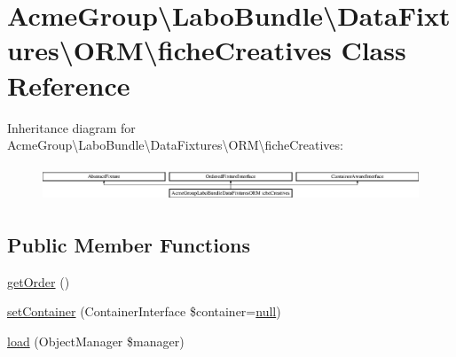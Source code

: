 \hypertarget{class_acme_group_1_1_labo_bundle_1_1_data_fixtures_1_1_o_r_m_1_1fiche_creatives}{\section{Acme\+Group\textbackslash{}Labo\+Bundle\textbackslash{}Data\+Fixtures\textbackslash{}O\+R\+M\textbackslash{}fiche\+Creatives Class Reference}
\label{class_acme_group_1_1_labo_bundle_1_1_data_fixtures_1_1_o_r_m_1_1fiche_creatives}
}
Inheritance diagram for Acme\+Group\textbackslash{}Labo\+Bundle\textbackslash{}Data\+Fixtures\textbackslash{}O\+R\+M\textbackslash{}fiche\+Creatives\+:\begin{figure}[H]
\begin{center}
\leavevmode
\includegraphics[height=1.060606cm]{class_acme_group_1_1_labo_bundle_1_1_data_fixtures_1_1_o_r_m_1_1fiche_creatives}
\end{center}
\end{figure}
\subsection*{Public Member Functions}
\begin{DoxyCompactItemize}
\item 
\hyperlink{class_acme_group_1_1_labo_bundle_1_1_data_fixtures_1_1_o_r_m_1_1fiche_creatives_a9c83e9b85b8dfa0dc03d74095778a0ca}{get\+Order} ()
\item 
\hyperlink{class_acme_group_1_1_labo_bundle_1_1_data_fixtures_1_1_o_r_m_1_1fiche_creatives_ad35796c102449c31345f0d5cee2d43b8}{set\+Container} (Container\+Interface \$container=\hyperlink{validate_8js_afb8e110345c45e74478894341ab6b28e}{null})
\item 
\hyperlink{class_acme_group_1_1_labo_bundle_1_1_data_fixtures_1_1_o_r_m_1_1fiche_creatives_a8df06ea642903ce3c17b0c8ca0e0f4f7}{load} (Object\+Manager \$manager)
\end{DoxyCompactItemize}


